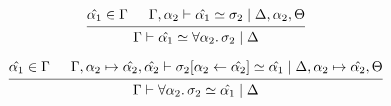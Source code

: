 \documentclass[12pt]{article}
\begin{document}
\[
    \begin{prooftree}
        \hypo{\hat{\alpha_1} \in \Gamma}
        \hypo{\Gamma, \alpha_2 \vdash \hat{\alpha_1} \simeq \sigma_2 \mid \Delta, \alpha_2, \Theta}
        \infer2{\Gamma \vdash \hat{\alpha_1} \simeq \forall \alpha_2\ldotp \sigma_2 \mid \Delta}
    \end{prooftree}
\]

\[
    \begin{prooftree}
        \hypo{\hat{\alpha_1} \in \Gamma}
        \hypo{\Gamma, \alpha_2 \mapsto \hat{\alpha_2}, \hat{\alpha_2} \vdash \sigma_2[\alpha_2 \leftarrow \hat{\alpha_2}] \simeq \hat{\alpha_1} \mid \Delta, \alpha_2 \mapsto \hat{\alpha_2}, \Theta}
        \infer2{\Gamma \vdash \forall \alpha_2\ldotp \sigma_2 \simeq \hat{\alpha_1} \mid \Delta}
    \end{prooftree}
\]
\end{document}
